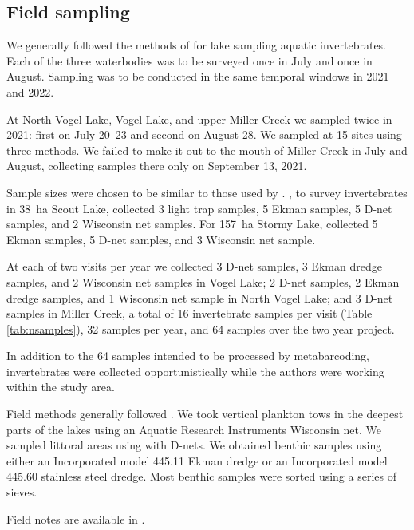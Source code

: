 \begin{multicols}{2}
\subsection{Field sampling}

We generally followed the methods of \citet{Massengill2014, Massengill2017} for lake sampling aquatic invertebrates. Each of the three waterbodies was to be surveyed once in July and once in August. Sampling was to be conducted in the same temporal windows in 2021 and 2022.

At North Vogel Lake, Vogel Lake, and upper Miller Creek we sampled twice in 2021: first on July 20--23 and second on August 28. We sampled at 15 sites using three methods. We failed to make it out to the mouth of Miller Creek in July and August, collecting samples there only on September 13, 2021. 

Sample sizes were chosen to be similar to those used by \citet{Massengill2014, Massengill2017}. \citet{Massengill2014}, to survey invertebrates in 38~ha Scout Lake, collected 3 light trap samples, 5 Ekman samples, 5 D-net samples, and 2 Wisconsin net samples. For 157~ha Stormy Lake, \citet{Massengill2014, Massengill2017} collected 5 Ekman samples, 5 D-net samples, and 3 Wisconsin net sample.



At each of two visits per year we collected 3 D-net samples, 3 Ekman dredge samples, and 2 Wisconsin net samples in Vogel Lake; 2 D-net samples, 2 Ekman dredge samples, and 1 Wisconsin net sample in North Vogel Lake; and 3 D-net samples in Miller Creek, a total of 16 invertebrate samples per visit (Table \ref{tab:nsamples}), 32 samples per year, and 64 samples over the two year project.

In addition to the 64 samples intended to be processed by metabarcoding, invertebrates were collected opportunistically while the authors were working within the study area.

Field methods generally followed \citet{Massengill2014, Massengill2017}. We took vertical plankton tows in the deepest parts of the lakes using an Aquatic Research Instruments Wisconsin net. We sampled littoral areas using with D-nets. We obtained benthic samples using either an  Incorporated model 445.11 Ekman dredge or an  Incorporated model 445.60  stainless steel dredge. Most benthic samples were sorted using a series of sieves.

Field notes are available in \citet{Bowser2022b}.


\end{multicols}
